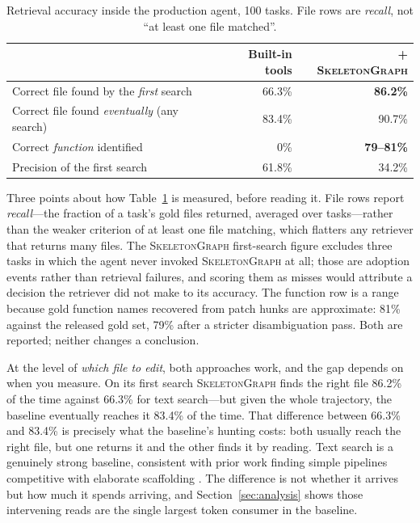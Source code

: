 \documentclass[11pt,letterpaper]{article}
\newcommand{\sg}{\textsc{SkeletonGraph}}
\begin{document}
\begin{table}[t]
\centering
\begin{tabular}{lrr}
\toprule
& Built-in tools & + \sg{} \\
\midrule
Correct file found by the \emph{first} search & 66.3\% & \textbf{86.2\%} \\
Correct file found \emph{eventually} (any search) & 83.4\% & 90.7\% \\
Correct \emph{function} identified & 0\% & \textbf{79--81\%} \\
\midrule
Precision of the first search & 61.8\% & 34.2\% \\
\bottomrule
\end{tabular}
\caption{Retrieval accuracy inside the production agent, 100 tasks. File rows are
\emph{recall}, not ``at least one file matched''.}
\label{tab:retrieval}
\end{table}

Three points about how Table~\ref{tab:retrieval} is measured, before reading it.
File rows report \emph{recall}---the fraction of a task's gold files returned,
averaged over tasks---rather than the weaker criterion of at least one file
matching, which flatters any retriever that returns many files. The
\sg{} first-search figure excludes three tasks in which the agent never invoked
\sg{} at all; those are adoption events rather than retrieval failures, and
scoring them as misses would attribute a decision the retriever did not make to
its accuracy. The function row is a range because gold function names recovered
from patch hunks are approximate: 81\% against the released gold set, 79\% after
a stricter disambiguation pass. Both are reported; neither changes a conclusion.

At the level of \emph{which file to edit}, both approaches work, and the gap
depends on when you measure. On its first search \sg{} finds the right file 86.2\%
of the time against 66.3\% for text search---but given the whole trajectory, the
baseline eventually reaches it 83.4\% of the time. That difference between 66.3\%
and 83.4\% is precisely what the baseline's hunting costs: both usually reach the
right file, but one returns it and the other finds it by reading. Text search is a
genuinely strong baseline, consistent with prior work finding simple pipelines competitive
with elaborate scaffolding \citep{agentless}. The difference is not whether it
arrives but how much it spends arriving, and Section~\ref{sec:analysis} shows
those intervening reads are the single largest token consumer in the baseline.
\end{document}
